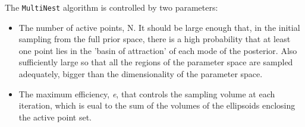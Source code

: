 The \texttt{MultiNest} algorithm is controlled by two parameters:
\begin{itemize}
\item The number of active points, N. It should be large enough that, in the initial sampling from the full prior space, there is a high probability that at least one point lies in the 'basin of attraction' of each mode of the posterior. Also sufficiently large so that all the regions of the parameter space are sampled adequately, bigger than the dimensionality of the parameter space. 
\item The maximum efficiency, \textit{e}, that controls the sampling volume at each iteration, which is eual to the sum of the volumes of the ellipsoids enclosing the active point set. 
\end{itemize}
